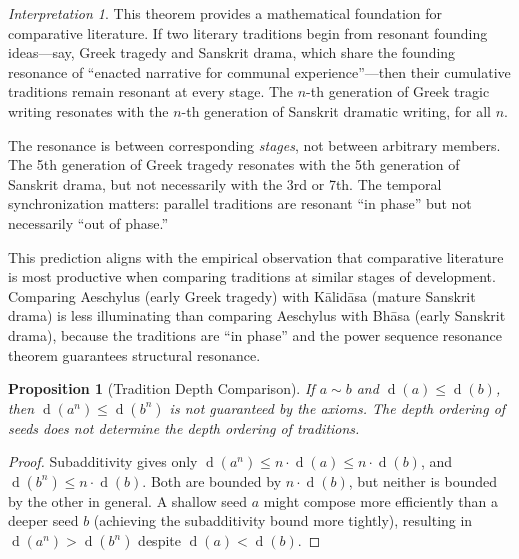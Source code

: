 \documentclass[11pt,openany]{book}
\theoremstyle{definition}
\theoremstyle{plain}
\newtheorem{proposition}[axiom]{Proposition}
\theoremstyle{remark}
\newtheorem{interpretation}[axiom]{Interpretation}
\newcommand{\res}{\sim}                      %
\newcommand{\depth}{\operatorname{d}}       %
\begin{document}
\begin{interpretation}
This theorem provides a mathematical foundation for comparative literature. If two literary traditions begin from resonant founding ideas---say, Greek tragedy and Sanskrit drama, which share the founding resonance of ``enacted narrative for communal experience''---then their cumulative traditions remain resonant at every stage. The $n$-th generation of Greek tragic writing resonates with the $n$-th generation of Sanskrit dramatic writing, for all $n$.

The resonance is between corresponding \emph{stages}, not between arbitrary members. The 5th generation of Greek tragedy resonates with the 5th generation of Sanskrit drama, but not necessarily with the 3rd or 7th. The temporal synchronization matters: parallel traditions are resonant ``in phase'' but not necessarily ``out of phase.''

This prediction aligns with the empirical observation that comparative literature is most productive when comparing traditions at similar stages of development. Comparing Aeschylus (early Greek tragedy) with Kālidāsa (mature Sanskrit drama) is less illuminating than comparing Aeschylus with Bhāsa (early Sanskrit drama), because the traditions are ``in phase'' and the power sequence resonance theorem guarantees structural resonance.
\end{interpretation}

\begin{proposition}[Tradition Depth Comparison]
If $a \res b$ and $\depth(a) \leq \depth(b)$, then $\depth(a^n) \leq \depth(b^n)$ is \emph{not} guaranteed by the axioms. The depth ordering of seeds does not determine the depth ordering of traditions.
\end{proposition}

\begin{proof}
Subadditivity gives only $\depth(a^n) \leq n \cdot \depth(a) \leq n \cdot \depth(b)$, and $\depth(b^n) \leq n \cdot \depth(b)$. Both are bounded by $n \cdot \depth(b)$, but neither is bounded by the other in general. A shallow seed $a$ might compose more efficiently than a deeper seed $b$ (achieving the subadditivity bound more tightly), resulting in $\depth(a^n) > \depth(b^n)$ despite $\depth(a) < \depth(b)$.
\end{proof}
\end{document}
